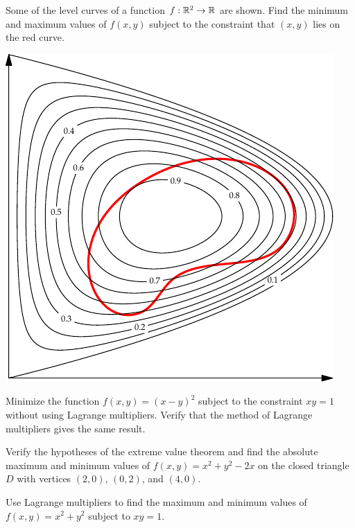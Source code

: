 \documentclass[prettycode,shellescape]{watsonbook}
\begin{document}
\begin{aexercise}
  Some of the level curves of a function $f: \mathbb{R}^2 \to \mathbb{R}$ are
  shown. Find the minimum and maximum values of $f(x,y)$ subject to
  the constraint that $(x,y)$ lies on the red curve.
  \begin{center}
    \includegraphics{exercisefigures/lagrange_exercise} 
  \end{center}
\end{aexercise}

\begin{aexercise}
  Minimize the function $f(x,y) = (x-y)^2$ subject to the constraint
  $xy = 1$ without using Lagrange multipliers. Verify that the method
  of Lagrange multipliers gives the same result.
\end{aexercise}

\begin{aexercise}
  Verify the hypotheses of the extreme value theorem and find the
  absolute maximum and minimum values of $f(x,y) = x^2+y^2-2x$ on the
  closed triangle $D$ with vertices $(2,0)$, $(0,2)$, and $(4,0)$.
\end{aexercise}

\begin{aexercise}
  Use Lagrange multipliers to find the maximum and minimum values of
  $f(x,y) = x^2 + y^2$ subject to $xy = 1$.
\end{aexercise}
\end{document}
